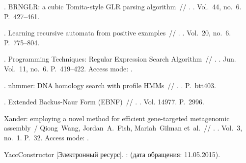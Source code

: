 \begin{thebibliography}{10}
	. {BRNGLR}: a
	cubic Tomita-style {GLR} parsing algorithm~// .
	\BibDash
	. \BibDash
	\newblock Vol.~44, no.~6. \BibDash
	\newblock P.~427--461.
	
	. Learning recursive automata from positive
	examples~// . \BibDash
	. \BibDash
	\newblock Vol.~20, no.~6. \BibDash
	\newblock P.~775--804.
	
	. Programming Techniques: Regular Expression Search
	Algorithm~// \href{http://dx.doi.org/10.1145/363347.363387}{}. \BibDash
	. \BibDash Jun. \BibDash
	\newblock Vol.~11, no.~6. \BibDash
	\newblock P.~419--422. \BibDash
	\newblock Access mode: .
	
	. nhmmer: DNA homology search with
	profile HMMs~// . \BibDash
	. \BibDash
	\newblock P.~btt403.
	
	. Extended Backus-Naur Form ({EBNF})~//
	. \BibDash
	. \BibDash
	\newblock Vol. 14977. \BibDash
	\newblock P.~2996.
	
	Xander: employing a novel method for efficient gene-targeted metagenomic
	assembly~/ Qiong~Wang, Jordan~A.~Fish, Mariah~Gilman et~al.~//
	\href{http://dx.doi.org/10.1186/s40168-015-0093-6}{}.
	\BibDash
	. \BibDash
	\newblock Vol.~3, no.~1. \BibDash
	\newblock P.~32. \BibDash
	\newblock Access mode: .
	
	YaccConstructor [Электронный ресурс]. \BibDash
	:
	 ({дата обращения}:
	11.05.2015).
	
\end{thebibliography}